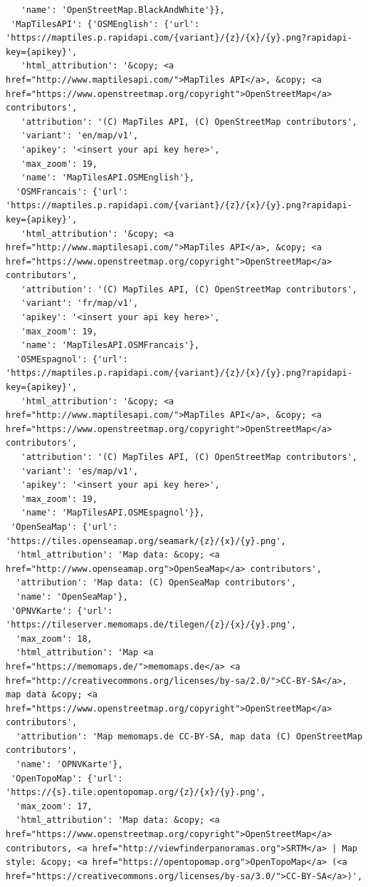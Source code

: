 \documentclass[
  letterpaper,
  DIV=11,
  numbers=noendperiod]{scrreprt}
\begin{document}
\begin{verbatim}
   'name': 'OpenStreetMap.BlackAndWhite'}},
 'MapTilesAPI': {'OSMEnglish': {'url': 'https://maptiles.p.rapidapi.com/{variant}/{z}/{x}/{y}.png?rapidapi-key={apikey}',
   'html_attribution': '&copy; <a href="http://www.maptilesapi.com/">MapTiles API</a>, &copy; <a href="https://www.openstreetmap.org/copyright">OpenStreetMap</a> contributors',
   'attribution': '(C) MapTiles API, (C) OpenStreetMap contributors',
   'variant': 'en/map/v1',
   'apikey': '<insert your api key here>',
   'max_zoom': 19,
   'name': 'MapTilesAPI.OSMEnglish'},
  'OSMFrancais': {'url': 'https://maptiles.p.rapidapi.com/{variant}/{z}/{x}/{y}.png?rapidapi-key={apikey}',
   'html_attribution': '&copy; <a href="http://www.maptilesapi.com/">MapTiles API</a>, &copy; <a href="https://www.openstreetmap.org/copyright">OpenStreetMap</a> contributors',
   'attribution': '(C) MapTiles API, (C) OpenStreetMap contributors',
   'variant': 'fr/map/v1',
   'apikey': '<insert your api key here>',
   'max_zoom': 19,
   'name': 'MapTilesAPI.OSMFrancais'},
  'OSMEspagnol': {'url': 'https://maptiles.p.rapidapi.com/{variant}/{z}/{x}/{y}.png?rapidapi-key={apikey}',
   'html_attribution': '&copy; <a href="http://www.maptilesapi.com/">MapTiles API</a>, &copy; <a href="https://www.openstreetmap.org/copyright">OpenStreetMap</a> contributors',
   'attribution': '(C) MapTiles API, (C) OpenStreetMap contributors',
   'variant': 'es/map/v1',
   'apikey': '<insert your api key here>',
   'max_zoom': 19,
   'name': 'MapTilesAPI.OSMEspagnol'}},
 'OpenSeaMap': {'url': 'https://tiles.openseamap.org/seamark/{z}/{x}/{y}.png',
  'html_attribution': 'Map data: &copy; <a href="http://www.openseamap.org">OpenSeaMap</a> contributors',
  'attribution': 'Map data: (C) OpenSeaMap contributors',
  'name': 'OpenSeaMap'},
 'OPNVKarte': {'url': 'https://tileserver.memomaps.de/tilegen/{z}/{x}/{y}.png',
  'max_zoom': 18,
  'html_attribution': 'Map <a href="https://memomaps.de/">memomaps.de</a> <a href="http://creativecommons.org/licenses/by-sa/2.0/">CC-BY-SA</a>, map data &copy; <a href="https://www.openstreetmap.org/copyright">OpenStreetMap</a> contributors',
  'attribution': 'Map memomaps.de CC-BY-SA, map data (C) OpenStreetMap contributors',
  'name': 'OPNVKarte'},
 'OpenTopoMap': {'url': 'https://{s}.tile.opentopomap.org/{z}/{x}/{y}.png',
  'max_zoom': 17,
  'html_attribution': 'Map data: &copy; <a href="https://www.openstreetmap.org/copyright">OpenStreetMap</a> contributors, <a href="http://viewfinderpanoramas.org">SRTM</a> | Map style: &copy; <a href="https://opentopomap.org">OpenTopoMap</a> (<a href="https://creativecommons.org/licenses/by-sa/3.0/">CC-BY-SA</a>)',

\end{verbatim}
\end{document}
